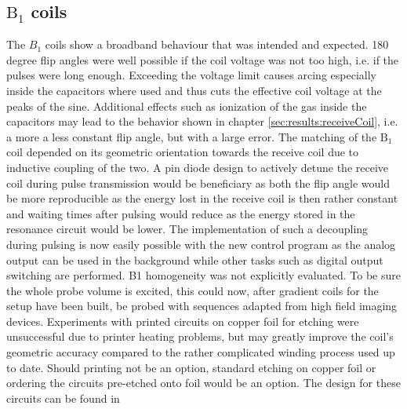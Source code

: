         \subsection{$\mathrm{B}_1$ coils}
        The $B_1$ coils show a broadband behaviour that was intended and expected. 180 degree flip angles were well possible if the coil voltage was not too high, i.e. if the pulses were long enough. Exceeding the voltage limit causes arcing especially inside the capacitors where used and thus cuts the effective coil voltage at the peaks of the sine. Additional effects such as ionization of the gas inside the capacitors may lead to the behavior shown in chapter \ref{sec:results:receiveCoil}, i.e. a more a less constant flip angle, but with a large error.
            The matching of the $\mathrm{B_1}$ coil depended on its geometric orientation towards the receive coil due to inductive coupling of the two. A pin diode design to actively detune the receive coil during pulse transmission would be beneficiary as both the flip angle would be more reproducible as the energy lost in the receive coil is then rather constant and waiting times after pulsing would reduce as the energy stored in the resonance circuit would be lower. The implementation of such a decoupling during pulsing is now easily possible with the new control program as the analog output can be used in the background while other tasks such as digital output switching are performed.
            B1 homogeneity was not explicitly evaluated. To be sure the whole probe volume is excited, this could now, after gradient coils for the setup have been built, be probed with sequences adapted from high field imaging devices.
            Experiments with printed circuits on copper foil for etching were unsuccessful due to printer  heating problems, but may greatly improve the coil's geometric accuracy compared to the rather complicated winding process used up to date. Should printing not be an option, standard etching on copper foil or ordering the circuits pre-etched onto foil would be an option.  The design for these circuits can be found in 

